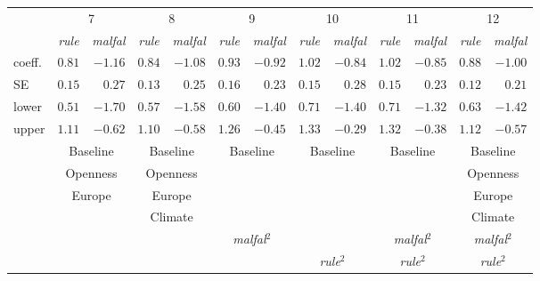  \begin{tabular}{lrrrrrrrrrrrr}
\hline \hline 
& \multicolumn{2}{c}{7} & \multicolumn{2}{c}{8} & \multicolumn{2}{c}{9} & \multicolumn{2}{c}{10} & \multicolumn{2}{c}{11} & \multicolumn{2}{c}{12}\\ 
& \multicolumn{1}{c}{\emph{rule}} & \multicolumn{1}{c}{\emph{malfal}} & \multicolumn{1}{c}{\emph{rule}} & \multicolumn{1}{c}{\emph{malfal}} & \multicolumn{1}{c}{\emph{rule}} & \multicolumn{1}{c}{\emph{malfal}} & \multicolumn{1}{c}{\emph{rule}} & \multicolumn{1}{c}{\emph{malfal}} & \multicolumn{1}{c}{\emph{rule}} & \multicolumn{1}{c}{\emph{malfal}} & \multicolumn{1}{c}{\emph{rule}} & \multicolumn{1}{c}{\emph{malfal}}\\ 
 \hline 
 
coeff. & $0.81$ & $-1.16$ & $0.84$ & $-1.08$ & $0.93$ & $-0.92$ & $1.02$ & $-0.84$ & $1.02$ & $-0.85$ & $0.88$ & $-1.00$\\ 
SE & $0.15$ & $0.27$ & $0.13$ & $0.25$ & $0.16$ & $0.23$ & $0.15$ & $0.28$ & $0.15$ & $0.23$ & $0.12$ & $0.21$\\ 
lower & $0.51$ & $-1.70$ & $0.57$ & $-1.58$ & $0.60$ & $-1.40$ & $0.71$ & $-1.40$ & $0.71$ & $-1.32$ & $0.63$ & $-1.42$\\ 
upper & $1.11$ & $-0.62$ & $1.10$ & $-0.58$ & $1.26$ & $-0.45$ & $1.33$ & $-0.29$ & $1.32$ & $-0.38$ & $1.12$ & $-0.57$\\ 
& \multicolumn{2}{c}{Baseline} & \multicolumn{2}{c}{Baseline} & \multicolumn{2}{c}{Baseline} & \multicolumn{2}{c}{Baseline} & \multicolumn{2}{c}{Baseline} & \multicolumn{2}{c}{Baseline}\\ 
& \multicolumn{2}{c}{Openness} & \multicolumn{2}{c}{Openness} & \multicolumn{2}{c}{} & \multicolumn{2}{c}{} & \multicolumn{2}{c}{} & \multicolumn{2}{c}{Openness}\\ 
& \multicolumn{2}{c}{Europe} & \multicolumn{2}{c}{Europe} & \multicolumn{2}{c}{} & \multicolumn{2}{c}{} & \multicolumn{2}{c}{} & \multicolumn{2}{c}{Europe}\\ 
& \multicolumn{2}{c}{} & \multicolumn{2}{c}{Climate} & \multicolumn{2}{c}{} & \multicolumn{2}{c}{} & \multicolumn{2}{c}{} & \multicolumn{2}{c}{Climate}\\ 
& \multicolumn{2}{c}{} & \multicolumn{2}{c}{} & \multicolumn{2}{c}{\emph{malfal}$^2$} & \multicolumn{2}{c}{} & \multicolumn{2}{c}{\emph{malfal}$^2$} & \multicolumn{2}{c}{\emph{malfal}$^2$}\\ 
& \multicolumn{2}{c}{} & \multicolumn{2}{c}{} & \multicolumn{2}{c}{} & \multicolumn{2}{c}{\emph{rule}$^2$} & \multicolumn{2}{c}{\emph{rule}$^2$} & \multicolumn{2}{c}{\emph{rule}$^2$}\\ 
 \hline
\end{tabular}